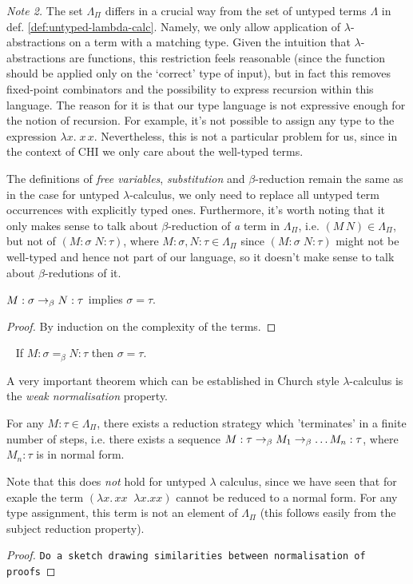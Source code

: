 \emph{Note 2.}
    The set $\Lambda_\Pi$ differs in a crucial way from the set of
    untyped terms $\Lambda$ in def.  \ref{def:untyped-lambda-calc}.
    Namely, we only allow application of $\lambda$-abstractions on a
    term with a matching type.  Given the intuition that
    $\lambda$-abstractions are functions, this restriction feels
    reasonable (since the function should be applied only on the
    `correct' type of input), but in fact this removes fixed-point
    combinators and the possibility to express recursion within this
    language. The reason for it is that our type language is not
    expressive enough for the notion of recursion. For example, it's
    not possible to assign any type to the expression $\lambda x.\; x\,
    x$. Nevertheless, this is not a particular problem for us, since in
    the context of CHI we only care about the well-typed terms.

The definitions of \emph{free variables}, \emph{substitution} and
$\beta$-reduction remain the same as in the case for untyped
$\lambda$-calculus, we only need to replace all untyped term occurrences with
explicitly typed ones. Furthermore, it's worth noting that it only makes sense
to talk about $\beta$-reduction of \emph{a} term in $\Lambda_\Pi$, i.e. $(M\,
N) \in \Lambda_\Pi$, but not of $(M\!:\!\sigma\; N\!:\!\tau)$, where $M:\sigma, N:\tau
\in \Lambda_\Pi$ since $(M\!:\!\sigma\; N\!:\!\tau)$ might not be well-typed and
hence not part of our language, so it doesn't make sense to talk about
$\beta$-redutions of it.

\begin{proposition}
    $M:\sigma \rightarrow_\beta N:\tau$ implies $\sigma = \tau$.
\end{proposition}
\begin{proof}
    By induction on the complexity of the terms.
\end{proof}

\begin{corollary} {\ }
    If $M:\sigma =_\beta N:\tau$ then $\sigma = \tau$.
\end{corollary}

A very important theorem which can be established in Church style
$\lambda$-calculus is the \emph{weak normalisation} property.
\begin{theorem}
    For any $M:\tau \in \Lambda_\Pi$, there exists a reduction strategy which
    'terminates' in a finite number of steps, i.e. there exists a sequence
    $M:\tau \rightarrow_\beta M_1 \rightarrow_\beta \ldots M_n:\tau$, where $M_n:\tau$ is in
    normal form.
\end{theorem}

Note that this does \emph{not} hold for untyped $\lambda$ calculus, since we
have seen that for exaple the term $(\lambda x.\, x x\;\; \lambda x. x x)$
cannot be reduced to a normal form. For any type assignment, this term is not
an element of $\Lambda_\Pi$ (this follows easily from the subject reduction
property).

\begin{proof}
    \texttt{Do a sketch drawing similarities between normalisation of proofs}
\end{proof}
